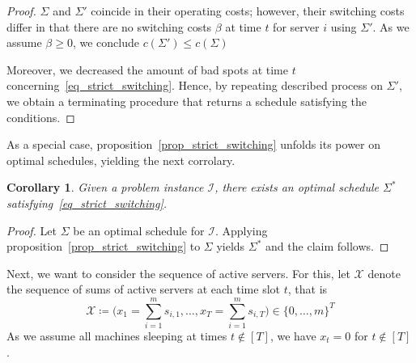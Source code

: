 \documentclass[hidelinks]{article}
\theoremstyle{plain}
\newtheorem{cor}[thm]{Corollary}
\theoremstyle{definition}
\theoremstyle{rem}
\newcommand{\mx}{\mathcal{X}}
\newcommand{\inp}{\mathcal{I}}
\newcommand{\costs}{c}
\newcommand{\fromto}[2]{\{#1,\ldots,#2\}}
\begin{document}
\begin{proof}
$\Sigma$ and $\Sigma'$ coincide in their operating costs; however, their switching costs differ in that there are no switching costs $\beta$ at time $t$ for server $i$ using $\Sigma'$. As we assume $\beta\ge0$, we conclude $\costs(\Sigma')\le \costs(\Sigma)$

Moreover, we decreased the amount of bad spots at time $t$ concerning~\eqref{eq_strict_switching}. Hence, by repeating described process on $\Sigma'$, we obtain a terminating procedure that returns a schedule satisfying the conditions.
\end{proof}

As a special case, proposition~\ref{prop_strict_switching} unfolds its power on optimal schedules, yielding the next corrolary.
\begin{cor}\label{cor_strict_opt_schedule}
Given a problem instance $\inp$, there exists an optimal schedule $\Sigma^*$ satisfying~\eqref{eq_strict_switching}.
\end{cor}
\begin{proof}
Let $\Sigma$ be an optimal schedule for $\inp$. Applying proposition~\ref{prop_strict_switching} to $\Sigma$ yields $\Sigma^*$ and the claim follows.
\end{proof}

Next, we want to consider the sequence of active servers. For this, let $\mx$ denote the sequence of sums of active servers at each time slot $t$, that is
\begin{equation*}
	\mx\coloneqq\bigl(x_1=\sum\limits_{i=1}^{m}s_{i,1},\ldots,x_T=\sum\limits_{i=1}^{m}s_{i,T}\bigr)\in\fromto{0}{m}^T
\end{equation*}
As we assume all machines sleeping at times $t\notin[T]$, we have $x_t=0$ for $t\notin[T]$.
\end{document}
